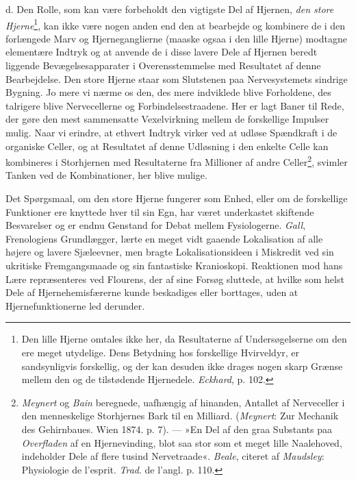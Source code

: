 \documentclass[12pt,a4paper,openany]{book}
\newcommand{\opage}[1]{\marginnote{\footnotesize\textit{[#1]}}}
\begin{document}
d. Den Rolle, som kan være forbeholdt den vigtigste Del af Hjernen,
\emph{den store Hjerne}\footnote[1]{Den lille Hjerne omtales ikke her,
da Resultaterne af Undersøgelserne om den ere meget utydelige. Dens
Betydning hos forskellige Hvirveldyr, er sandsynligvis forskellig, og
der kan desuden ikke drages nogen skarp Grænse mellem den og de
tilstødende Hjernedele. \emph{Eckhard}, p. 102.}, kan ikke være nogen
anden end den at bearbejde og kombinere de i den forlængede Marv og
Hjerneganglierne (maaske ogsaa i den lille Hjerne) modtagne elementære
Indtryk og at anvende de i disse lavere Dele af Hjernen beredt liggende
Bevægelsesapparater i Overensstemmelse med Resultatet af denne
Bearbejdelse. Den store Hjerne staar som Slutstenen paa Nervesystemets
sindrige Bygning. Jo mere vi nærme os den, des mere indviklede blive
Forholdene, des talrigere blive Nervecellerne og Forbindelsestraadene.
Her er lagt Baner til Rede, der gøre den mest sammensatte Vexelvirkning
mellem de forskellige Impulser
\opage{49}mulig. Naar vi erindre, at ethvert Indtryk virker ved at
udløse Spændkraft i de organiske Celler, og at Resultatet af denne
Udløsning i den enkelte Celle kan kombineres i Storhjernen med
Resultaterne fra Millioner af andre Celler\footnote[1]{\emph{Meynert} og
\emph{Bain} beregnede, uafhængig af hinanden, Antallet af Nerveceller i
den menneskelige Storhjernes Bark til en Milliard. (\emph{Meynert}: Zur
Mechanik des Gehirnbaues. Wien 1874. p. 7). --- »En Del af den graa
Substants paa \emph{Overfladen} af en Hjernevinding, blot saa stor som
et meget lille Naalehoved, indeholder Dele af flere tusind Nervetraade«.
\emph{Beale}, citeret af \emph{Maudsley}: Physiologie de l’esprit.
\emph{Trad}. de l’angl. p. 110.}, svimler Tanken ved de Kombinationer,
her blive mulige.

Det Spørgsmaal, om den store Hjerne fungerer som Enhed, eller om de
forskellige Funktioner ere knyttede hver til sin Egn, har været
underkastet skiftende Besvarelser og er endnu Genstand for Debat mellem
Fysiologerne. \emph{Gall}, Frenologiens Grundlægger, lærte en meget vidt
gaaende Lokalisation af alle højere og lavere Sjæleevner, men bragte
Lokalisationsideen i Miskredit ved sin ukritiske Fremgangsmaade og sin
fantastiske Kranioskopi. Reaktionen mod hans Lære repræsenteres ved
Flourens, der af sine Forsøg sluttede, at hvilke som helst Dele af
Hjernehemisfærerne kunde beskadiges eller borttages, uden at
Hjernefunktionerne led derunder.
\end{document}
